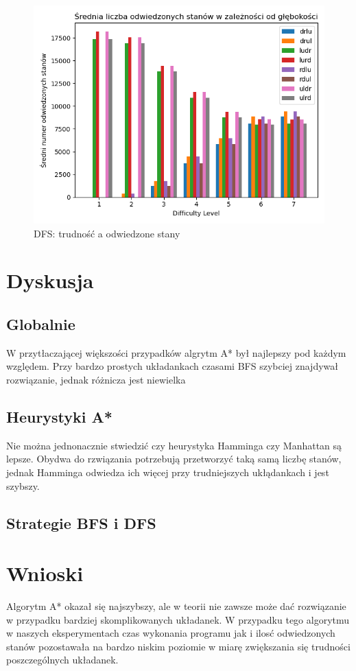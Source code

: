 \documentclass{classrep}
\begin{document}
\begin{figure}[p] \centering
 \includegraphics[width=0.9\linewidth]{./pic/dfs_vstd_c_vs_diff.png}
 \caption{DFS: trudność a odwiedzone stany}
\end{figure}

\section{Dyskusja}
\subsection{Globalnie}
W przytłaczającej większości przypadków algrytm A* był najlepszy pod każdym względem.
Przy bardzo prostych układankach czasami BFS szybciej znajdywał rozwiązanie, jednak różnicza jest niewielka

\subsection{Heurystyki A*}
Nie można jednonacznie stwiedzić czy heurystyka Hamminga czy Manhattan są lepsze.
Obydwa do rzwiązania potrzebują przetworzyć taką samą liczbę stanów, jednak Hamminga odwiedza ich więcej przy trudniejszych ukłądankach i  jest szybszy.

\subsection{Strategie BFS i DFS}

\section{Wnioski}
Algorytm A* okazał się najszybszy, ale w teorii nie zawsze może dać rozwiązanie w przypadku bardziej skomplikowanych układanek. W przypadku tego algorytmu w naszych eksperymentach czas wykonania programu jak i ilosć odwiedzonych stanów pozostawała na bardzo niskim poziomie w miarę zwiększania się trudności poszczególnych układanek. 
\end{document}
